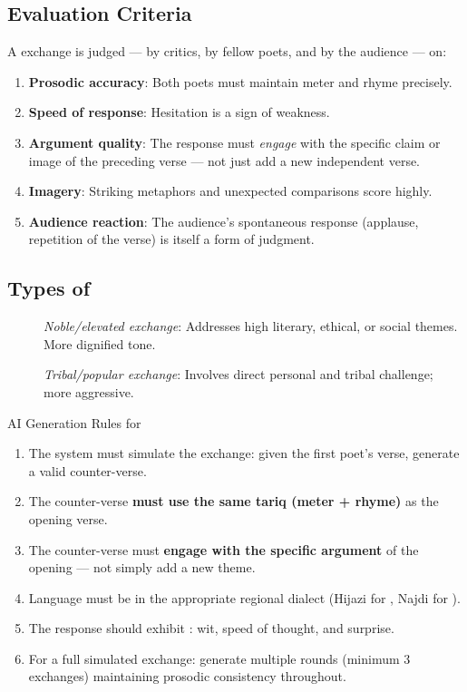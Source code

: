 \subsection{Evaluation Criteria}

A  exchange is judged — by critics, by fellow poets, and by the audience — on:
\begin{enumerate}
  \item \textbf{Prosodic accuracy}: Both poets must maintain meter and rhyme precisely.
  \item \textbf{Speed of response}: Hesitation is a sign of weakness.
  \item \textbf{Argument quality}: The response must \textit{engage} with the specific claim or image of the preceding verse — not just add a new independent verse.
  \item \textbf{Imagery}: Striking metaphors and unexpected comparisons score highly.
  \item \textbf{Audience reaction}: The audience's spontaneous response (applause, repetition of the verse) is itself a form of judgment.
\end{enumerate}

\subsection{Types of }

\begin{description}
  \item[] \textit{Noble/elevated exchange}: Addresses high literary, ethical, or social themes. More dignified tone.
  \item[] \textit{Tribal/popular exchange}: Involves direct personal and tribal challenge; more aggressive.
\end{description}

\begin{rulebox}{AI Generation Rules for }
\begin{enumerate}
  \item The system must simulate the exchange: given the first poet's verse, generate a valid counter-verse.
  \item The counter-verse \textbf{must use the same tariq (meter + rhyme)} as the opening verse.
  \item The counter-verse must \textbf{engage with the specific argument} of the opening — not simply add a new theme.
  \item Language must be in the appropriate regional dialect (Hijazi for , Najdi for ).
  \item The response should exhibit : wit, speed of thought, and surprise.
  \item For a full simulated exchange: generate multiple rounds (minimum 3 exchanges) maintaining prosodic consistency throughout.
\end{enumerate}
\end{rulebox}

